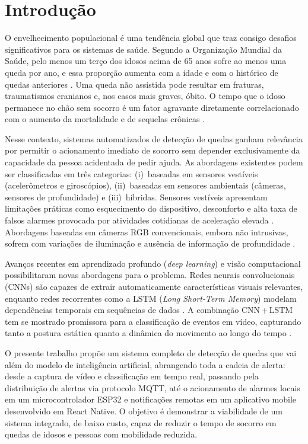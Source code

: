 \documentclass[12pt,a4paper]{article}
\begin{document}
\section{Introdução}

O envelhecimento populacional é uma tendência global que traz consigo desafios significativos para os sistemas de saúde. Segundo a Organização Mundial da Saúde, pelo menos um terço dos idosos acima de 65 anos sofre ao menos uma queda por ano, e essa proporção aumenta com a idade e com o histórico de quedas anteriores \citep{lord2001, heinrich2010}. Uma queda não assistida pode resultar em fraturas, traumatismos cranianos e, nos casos mais graves, óbito. O tempo que o idoso permanece no chão sem socorro é um fator agravante diretamente correlacionado com o aumento da mortalidade e de sequelas crônicas \citep{kwolek2014}.

Nesse contexto, sistemas automatizados de detecção de quedas ganham relevância por permitir o acionamento imediato de socorro sem depender exclusivamente da capacidade da pessoa acidentada de pedir ajuda. As abordagens existentes podem ser classificadas em três categorias: (i)~baseadas em sensores vestíveis (acelerômetros e giroscópios), (ii)~baseadas em sensores ambientais (câmeras, sensores de profundidade) e (iii)~híbridas. Sensores vestíveis apresentam limitações práticas como esquecimento do dispositivo, desconforto e alta taxa de falsos alarmes provocada por atividades cotidianas de aceleração elevada \citep{kwolek2014, mubashir2013}. Abordagens baseadas em câmeras RGB convencionais, embora não intrusivas, sofrem com variações de iluminação e ausência de informação de profundidade \citep{kwolek2014}.

Avanços recentes em aprendizado profundo (\textit{deep learning}) e visão computacional possibilitaram novas abordagens para o problema. Redes neurais convolucionais (CNNs) são capazes de extrair automaticamente características visuais relevantes, enquanto redes recorrentes como a LSTM (\textit{Long Short-Term Memory}) modelam dependências temporais em sequências de dados \citep{lstm1997}. A combinação CNN\,+\,LSTM tem se mostrado promissora para a classificação de eventos em vídeo, capturando tanto a postura estática quanto a dinâmica do movimento ao longo do tempo \citep{lu2019}.

O presente trabalho propõe um sistema completo de detecção de quedas que vai além do modelo de inteligência artificial, abrangendo toda a cadeia de alerta: desde a captura de vídeo e classificação em tempo real, passando pela distribuição de alertas via protocolo MQTT, até o acionamento de alarmes locais em um microcontrolador ESP32 e notificações remotas em um aplicativo mobile desenvolvido em React Native. O objetivo é demonstrar a viabilidade de um sistema integrado, de baixo custo, capaz de reduzir o tempo de socorro em quedas de idosos e pessoas com mobilidade reduzida.
\end{document}
